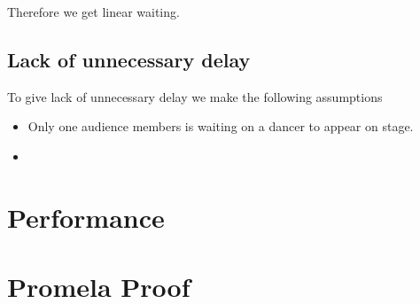 \documentclass[12pt,a4paper]{scrartcl}
\begin{document}
Therefore we get linear waiting.

\subsection{Lack of unnecessary delay}
To give lack of unnecessary delay we make the following assumptions
\begin{itemize}
    \item Only one audience members is waiting on a dancer to appear on stage.
    \item 
\end{itemize}

\section{Performance}

\section{Promela Proof}
\end{document}
